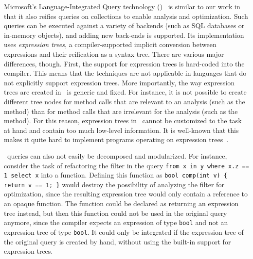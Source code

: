 Microsoft's Language-Integrated Query technology (\LINQ)~\citep{Meijer:2006:LRO:1142473.1142552,Bierman:2007:LTF:1297027.1297063} is similar to our work in that it also
reifies queries on collections to enable analysis and optimization. Such queries can be executed against a variety of backends (such as SQL databases or in-memory objects), and adding new back-ends is supported. Its implementation uses \emph{expression trees}, a compiler-supported
implicit conversion between expressions and their reification as a syntax tree. There are various major differences, though.
First, the support for expression trees is hard-coded into the compiler. This means that the techniques are not applicable in languages 
that do not explicitly support expression trees. More importantly, the way expression trees are created in \LINQ\ is generic and fixed.
For instance, it is not possible to create different tree nodes for method calls that are relevant to an analysis (such as the  method) than for method calls that are irrelevant for the analysis (such as the  method). For this reason, expression trees in \LINQ\ 
cannot be customized to the task at hand and contain too much low-level information. It is well-known that this makes it quite hard to
implement programs operating on expression trees~\citep{Eini11Pain}. 

\LINQ\ queries can also not easily be decomposed and modularized. For instance, consider the task of refactoring the filter in the query {\tt from x in y where x.z == 1 select x}
into a function. Defining this function as {\tt bool comp(int v) \{ return v == 1; \}} would destroy the possibility of analyzing the filter for optimization, since
the resulting expression tree would only contain a reference to an opaque function. The function could be declared as returning an expression tree instead, but then
this function could not be used in the original query anymore, since the compiler expects an expression of type {\tt bool} and not an expression tree of type {\tt bool}.
It could only be integrated if the expression tree of the original query is created by hand, without using the built-in support for expression trees.


